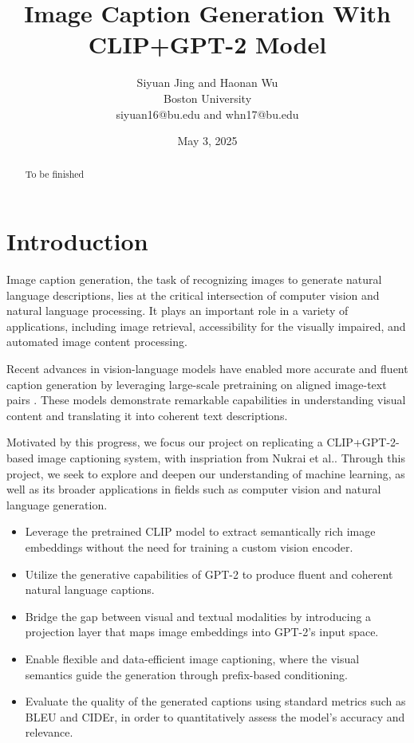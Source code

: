 \documentclass[11pt]{article}
\begin{document}
\title{Image Caption Generation With CLIP+GPT-2 Model}
\author{Siyuan Jing and Haonan Wu\\ Boston University \\ siyuan16@bu.edu and whn17@bu.edu}
\date{May 3, 2025}
\maketitle

\begin{abstract}
To be finished
\end{abstract}

\section{Introduction}
Image caption generation, the task of recognizing images to generate natural language descriptions, lies at the critical intersection of 
computer vision and natural language processing. 
It plays an important role in a variety of applications, including image retrieval, accessibility for the visually impaired, and automated image content processing.

Recent advances in vision-language models have enabled more accurate and 
fluent caption generation by leveraging large-scale pretraining on aligned image-text pairs 
. These models demonstrate remarkable capabilities in understanding visual content and 
translating it into coherent text descriptions.

Motivated by this progress, we focus our project on replicating a CLIP+GPT-2-based image captioning system, with inspriation from Nukrai et al.\cite{Nukrai2022}. Through this project, we seek to explore and deepen our understanding of 
machine learning, as well as its broader applications in fields such as computer vision and natural language generation.
\begin{itemize}
    \item Leverage the pretrained CLIP model to extract semantically rich image embeddings without the need for training a custom vision encoder.
    \item Utilize the generative capabilities of GPT-2 to produce fluent and coherent natural language captions.
    \item Bridge the gap between visual and textual modalities by introducing a projection layer that maps image embeddings into GPT-2's input space.
    \item Enable flexible and data-efficient image captioning, where the visual semantics guide the generation through prefix-based conditioning.
    \item Evaluate the quality of the generated captions using standard metrics such as BLEU and CIDEr, in order to quantitatively assess the model's accuracy and relevance.
\end{itemize}
\pagebreak
\end{document}
